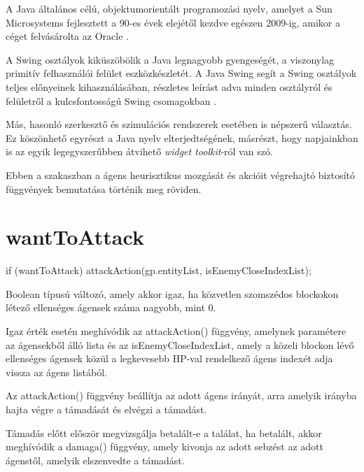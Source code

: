 


A Java általános célú, objektumorientált programozási nyelv, amelyet a Sun Microsystems fejlesztett a 90-es évek elejétől kezdve egészen 2009-ig, amikor a céget felvásárolta az Oracle \cite{arnold2005java}.


A Swing osztályok kiküszöbölik a Java legnagyobb gyengeségét, a viszonylag primitív felhasználói felület eszközkészletét. A Java Swing segít a Swing osztályok teljes előnyeinek kihasználásában,
részletes leírást adva minden osztályról és felületről a kulcsfontosságú Swing csomagokban \cite{10.5555/291162}.

Más, hasonló szerkesztő és szimulációs rendszerek esetében is népszerű választás. Ez köszönhető egyrészt a Java nyelv elterjedtségének, másrészt, hogy napjainkban is az egyik legegyszerűbben átvihető \textit{widget toolkit}-ról van szó.


Ebben a szakaszban a ágens heurisztikus mozgását és akcióit végrehajtó biztosító függvények bemutatása történik meg röviden.

\section{wantToAttack}

\begin{java}
if (wantToAttack) {
    attackAction(gp.entityList, isEnemyCloseIndexList);
}    
\end{java}

Boolean típusú változó, amely akkor igaz, ha közvetlen szomszédos blockokon létező
ellenséges ágensek száma nagyobb, mint 0.

Igaz érték esetén meghívódik az attackAction() függvény, amelynek paramétere az ágensekből álló lista és 
az isEnemyCloseIndexList, amely a közeli blockon lévő ellenséges ágensek közül a legkevesebb
HP-val rendelkező ágens indexét adja vissza az ágens listából.

Az attackAction() függvény beállítja az adott ágens irányát, arra amelyik irányba hajta végre a támadását és 
elvégzi a támadást.

Támadás előtt először megvizsgálja betalált-e a találat, ha betalált, akkor meghívódik a damaga() függvény, amely
kivonja az adott sebzést az adott ágenstől, amelyik elszenvedte a támadást.

